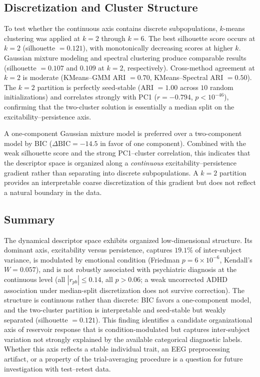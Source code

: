 \subsection{Discretization and Cluster Structure}

To test whether the continuous axis contains discrete subpopulations, $k$-means clustering was applied at $k = 2$ through $k = 6$. The best silhouette score occurs at $k = 2$ (silhouette $= 0.121$), with monotonically decreasing scores at higher $k$. Gaussian mixture modeling and spectral clustering produce comparable results (silhouette $= 0.107$ and $0.109$ at $k = 2$, respectively). Cross-method agreement at $k = 2$ is moderate (KMeans--GMM ARI $= 0.70$, KMeans--Spectral ARI $= 0.50$). The $k = 2$ partition is perfectly seed-stable (ARI $= 1.00$ across $10$ random initializations) and correlates strongly with PC1 ($r = -0.794$, $p < 10^{-46}$), confirming that the two-cluster solution is essentially a median split on the excitability--persistence axis.

A one-component Gaussian mixture model is preferred over a two-component model by BIC ($\Delta\text{BIC} = -14.5$ in favor of one component). Combined with the weak silhouette score and the strong PC1--cluster correlation, this indicates that the descriptor space is organized along a \emph{continuous} excitability--persistence gradient rather than separating into discrete subpopulations. A $k = 2$ partition provides an interpretable coarse discretization of this gradient but does not reflect a natural boundary in the data.

\subsection{Summary}

The dynamical descriptor space exhibits organized low-dimensional structure. Its dominant axis, excitability versus persistence, captures $19.1\%$ of inter-subject variance, is modulated by emotional condition (Friedman $p = 6 \times 10^{-6}$, Kendall's $W = 0.057$), and is not robustly associated with psychiatric diagnosis at the continuous level (all $|r_{pb}| \leq 0.14$, all $p > 0.06$; a weak uncorrected ADHD association under median-split discretization does not survive correction). The structure is continuous rather than discrete: BIC favors a one-component model, and the two-cluster partition is interpretable and seed-stable but weakly separated (silhouette $= 0.121$). This finding identifies a candidate organizational axis of reservoir response that is condition-modulated but captures inter-subject variation not strongly explained by the available categorical diagnostic labels. Whether this axis reflects a stable individual trait, an EEG preprocessing artifact, or a property of the trial-averaging procedure is a question for future investigation with test--retest data.
